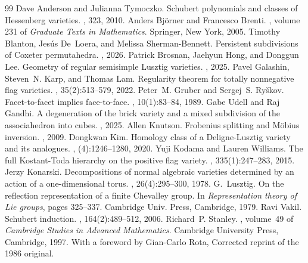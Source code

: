 \documentclass[10pt,a4paper]{amsart}
\begin{document}
\begin{thebibliography}{99}
 Dave Anderson and Julianna Tymoczko. \newblock Schubert polynomials and classes of {H}essenberg varieties. , 323, 2010.
 Anders Bj\"orner and Francesco Brenti. , volume 231 of {\em Graduate Texts in Mathematics}. \newblock Springer, New York, 2005.
 Timothy Blanton, Jes\'{u}s De~Loera, and Melissa Sherman-Bennett. \newblock Persistent subdivisions of {C}oxeter permutahedra. , 2026.
 Patrick Brosnan, Jaehyun Hong, and Donggun Lee. \newblock Geometry of regular semisimple {L}usztig varieties. , 2025.
 Pavel Galashin, Steven~N. Karp, and Thomas Lam. \newblock Regularity theorem for totally nonnegative flag varieties. , 35(2):513--579, 2022.
 Peter~M. Gruber and Sergej~S. Ryškov. \newblock Facet-to-facet implies face-to-face. , 10(1):83--84, 1989.
 Gabe Udell and Raj Gandhi. \newblock A degeneration of the brick variety and a mixed subdivision of the associahedron into cubes. , 2025.
 Allen Knutson. \newblock Frobenius splitting and {M}\"obius inversion. , 2009.
 Dongkwan Kim. \newblock Homology class of a {D}eligne-{L}usztig variety and its analogues. , (4):1246--1280, 2020.
 Yuji Kodama and Lauren Williams. \newblock The full {K}ostant-{T}oda hierarchy on the positive flag variety. , 335(1):247--283, 2015.
 Jerzy Konarski. \newblock Decompositions of normal algebraic varieties determined by an action of a one-dimensional torus. , 26(4):295--300, 1978.
 G.~Lusztig. \newblock On the reflection representation of a finite {C}hevalley group. \newblock In {\em Representation theory of {L}ie groups}, pages 325--337. Cambridge Univ. Press, Cambridge, 1979.
 Ravi Vakil. \newblock Schubert induction. , 164(2):489--512, 2006.
 Richard~P. Stanley. , volume~49 of {\em Cambridge Studies in Advanced Mathematics}. \newblock Cambridge University Press, Cambridge, 1997. \newblock With a foreword by Gian-Carlo Rota, Corrected reprint of the 1986 original.

\end{thebibliography}
\end{document}
